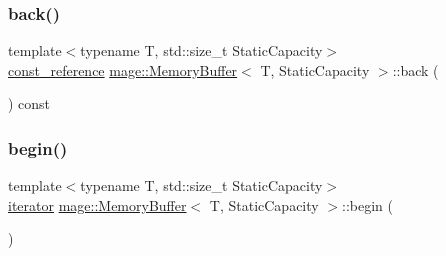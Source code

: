 \mbox{\label{classmage_1_1_memory_buffer_ad3e88cdcf2b50096424cf4186f6d8b87}} 
\subsubsection{\texorpdfstring{back()}{back()}\hspace{0.1cm}{\footnotesize\ttfamily [2/2]}}
{\footnotesize\ttfamily template$<$typename T, std\+::size\+\_\+t Static\+Capacity$>$ \\
\mbox{\hyperlink{classmage_1_1_memory_buffer_aa54883bc0cb483fef570663344f85bb7}{const\+\_\+reference}} \mbox{\hyperlink{classmage_1_1_memory_buffer}{mage\+::\+Memory\+Buffer}}$<$ T, Static\+Capacity $>$\+::back (\begin{DoxyParamCaption}{ }\end{DoxyParamCaption}) const\hspace{0.3cm}{\ttfamily [noexcept]}}

\mbox{\label{classmage_1_1_memory_buffer_a499abd90d19aebe0441a21fbafe499e5}} 
\subsubsection{\texorpdfstring{begin()}{begin()}\hspace{0.1cm}{\footnotesize\ttfamily [1/2]}}
{\footnotesize\ttfamily template$<$typename T, std\+::size\+\_\+t Static\+Capacity$>$ \\
\mbox{\hyperlink{classmage_1_1_memory_buffer_af487a5f5f07f8ba65e3a5d3a26d32b6c}{iterator}} \mbox{\hyperlink{classmage_1_1_memory_buffer}{mage\+::\+Memory\+Buffer}}$<$ T, Static\+Capacity $>$\+::begin (\begin{DoxyParamCaption}{ }\end{DoxyParamCaption})\hspace{0.3cm}{\ttfamily [noexcept]}}

\mbox{\label{classmage_1_1_memory_buffer_a47f825ee6c86a8afb40d4b632a051bb0}} 
